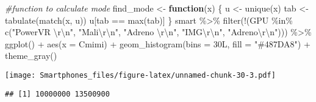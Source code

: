 \documentclass[
]{article}
\newenvironment{Shaded}{\begin{snugshade}}{\end{snugshade}}
\newcommand{\AttributeTok}[1]{\textcolor[rgb]{0.77,0.63,0.00}{#1}}
\newcommand{\CommentTok}[1]{\textcolor[rgb]{0.56,0.35,0.01}{\textit{#1}}}
\newcommand{\ControlFlowTok}[1]{\textcolor[rgb]{0.13,0.29,0.53}{\textbf{#1}}}
\newcommand{\FunctionTok}[1]{\textcolor[rgb]{0.00,0.00,0.00}{#1}}
\newcommand{\NormalTok}[1]{#1}
\newcommand{\OtherTok}[1]{\textcolor[rgb]{0.56,0.35,0.01}{#1}}
\newcommand{\SpecialCharTok}[1]{\textcolor[rgb]{0.00,0.00,0.00}{#1}}
\newcommand{\StringTok}[1]{\textcolor[rgb]{0.31,0.60,0.02}{#1}}
\begin{document}
\begin{Shaded}
\begin{Highlighting}[]
\CommentTok{\#function to calculate mode}
\NormalTok{find\_mode }\OtherTok{\textless{}{-}} \ControlFlowTok{function}\NormalTok{(x) \{}
\NormalTok{  u }\OtherTok{\textless{}{-}} \FunctionTok{unique}\NormalTok{(x)}
\NormalTok{  tab }\OtherTok{\textless{}{-}} \FunctionTok{tabulate}\NormalTok{(}\FunctionTok{match}\NormalTok{(x, u))}
\NormalTok{  u[tab }\SpecialCharTok{==} \FunctionTok{max}\NormalTok{(tab)]}
\NormalTok{\}}
\NormalTok{smart }\SpecialCharTok{\%\textgreater{}\%}
 \FunctionTok{filter}\NormalTok{(}\SpecialCharTok{!}\NormalTok{(GPU }\SpecialCharTok{\%in\%} \FunctionTok{c}\NormalTok{(}\StringTok{"PowerVR }\SpecialCharTok{\textbackslash{}r\textbackslash{}n}\StringTok{"}\NormalTok{, }\StringTok{"Mali}\SpecialCharTok{\textbackslash{}r\textbackslash{}n}\StringTok{"}\NormalTok{, }\StringTok{"Adreno }\SpecialCharTok{\textbackslash{}r\textbackslash{}n}\StringTok{"}\NormalTok{, }\StringTok{"IMG}\SpecialCharTok{\textbackslash{}r\textbackslash{}n}\StringTok{"}\NormalTok{, }\StringTok{"Adreno}\SpecialCharTok{\textbackslash{}r\textbackslash{}n}\StringTok{"}\NormalTok{))) }\SpecialCharTok{\%\textgreater{}\%}
 \FunctionTok{ggplot}\NormalTok{() }\SpecialCharTok{+}
  \FunctionTok{aes}\NormalTok{(}\AttributeTok{x =}\NormalTok{ Cmimi) }\SpecialCharTok{+}
  \FunctionTok{geom\_histogram}\NormalTok{(}\AttributeTok{bins =}\NormalTok{ 30L, }\AttributeTok{fill =} \StringTok{"\#487DA8"}\NormalTok{) }\SpecialCharTok{+}
  \FunctionTok{theme\_gray}\NormalTok{()}
\end{Highlighting}
\end{Shaded}

\texttt{[image: Smartphones\_files/figure-latex/unnamed-chunk-30-3.pdf]}

\begin{Shaded}
\end{Shaded}

\begin{verbatim}
## [1] 10000000 13500900
\end{verbatim}
\end{document}
